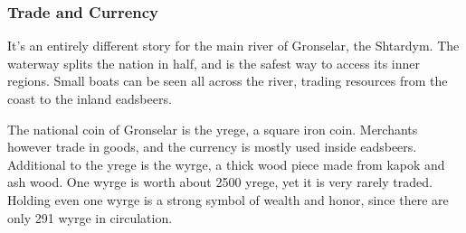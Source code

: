 \subsubsection{Trade and Currency}

It's an entirely different story for the main river of Gronselar, the Shtardym.
The waterway splits the nation in half, and is the safest way to access its inner regions.
Small boats can be seen all across the river, trading resources from the coast to the inland eadsbeers.

The national coin of Gronselar is the yrege, a square iron coin.
Merchants however trade in goods, and the currency is mostly used inside eadsbeers.
Additional to the yrege is the wyrge, a thick wood piece made from kapok and ash wood.
One wyrge is worth about 2500 yrege, yet it is very rarely traded.
Holding even one wyrge is a strong symbol of wealth and honor, since there are only 291 wyrge in circulation.




